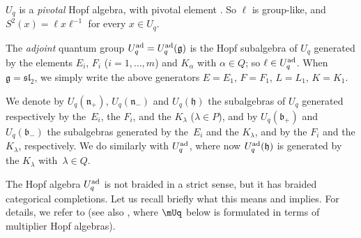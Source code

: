 $U_q$ is a {\it pivotal} Hopf algebra, with pivotal element .
So $\ell$ is group-like, and $S^2(x) = \ell x\ell^{-1}$ for every $x\in U_q$.

The {\it adjoint} quantum group $U_q^{\rm ad} = U_q^{\rm ad}(\mathfrak{g})$ is the Hopf subalgebra of $U_q$ generated by the elements $E_i$, $F_i$ ($i=1,\dots,m$) and $K_\alpha$ with $\alpha\in Q$; so $\ell\in U_q^{\rm ad}$. When $\mathfrak{g}={\mathfrak{sl}_2}$, we simply write the above generators $E=E_1$, $F=F_1$, $L=L_1$, $K=K_1$.

We denote by $U_q(\mathfrak{n}_+)$, $U_q(\mathfrak{n}_-)$ and $U_q(\mathfrak{h})$ the subalgebras of $U_q$ generated respectively by the~$E_i$, the $F_i$, and the $K_\lambda$ ($\lambda\in P$), and by $U_q(\mathfrak{b}_+)$ and $U_q(\mathfrak{b}_-)$ the subalgebras generated by the~$E_i$ and the $K_\lambda$, and by the $F_i$ and the $K_\lambda$, respectively. We do similarly with $U_q^{\rm ad}$, where now $U_q^{\rm ad}(\mathfrak{h})$ is generated by the $K_\lambda$ with~$\lambda\in Q$.

The Hopf algebra $U_q^{\rm ad}$ is not braided in a strict sense, but it has braided categorical completions. Let us recall briefly what this means and implies. For details, we refer to \cite[Sections~2 and~3]{BR} (see also \cite[Section~3.10]{VY}, where $\mUq$ below is formulated in terms of multiplier Hopf algebras).


